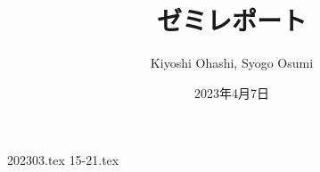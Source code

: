 \documentclass{jsarticle}
\title{ゼミレポート}
\author{Kiyoshi Ohashi, Syogo Osumi}
\date{2023年4月7日}
\theoremstyle{definition}
\begin{document}
  \maketitle

  {202303.tex}
  {15-21.tex}
\end{document}
